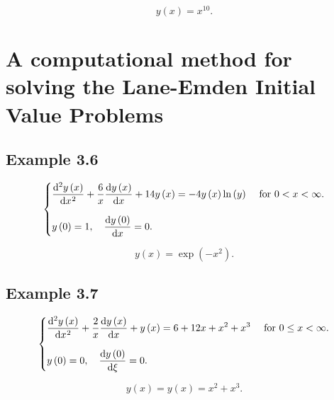 \documentclass{scrartcl}
\begin{document}
\begin{equation*}
	\boxed{y\left(x\right)=x^{10}.}
\end{equation*}

\section{A computational method for solving the Lane-Emden Initial Value Problems}

\subsection*{Example 3.6}

\begin{equation}
	\begin{cases}\displaystyle
		\diff[2]{y\left(x\right)}{x}+
		\frac{6}{x}
		\diff{y\left(x\right)}{x}+
		14y\left(x\right)=
		-4y\left(x\right)
		\ln\left(y\right)
		 & \text { for }0<x<\infty. \\[0.5cm]
		\displaystyle
		y
		\left(0\right)=
		1,\quad
		\diff{y\left(0\right)}{x}=
		0.
		 &
	\end{cases}
\end{equation}

\begin{equation*}
	\boxed{y\left(x\right)=\exp\left(-x^{2}\right).}
\end{equation*}

\subsection*{Example 3.7}

\begin{equation}
	\begin{cases}\displaystyle
		\diff[2]{y\left(x\right)}{x}+
		\frac{2}{x}
		\diff{y\left(x\right)}{x}+
		y\left(x\right)=
		6+12x+x^{2}+x^{3}
		 & \text { for }0\leq x<\infty. \\[0.5cm]
		\displaystyle
		y
		\left(0\right)=
		0,\quad
		\diff{y\left(0\right)}{\xi}=
		0.
		 &
	\end{cases}
\end{equation}

\begin{equation*}
	\boxed{y\left(x\right)=y\left(x\right)=x^{2}+x^{3}.}
\end{equation*}
\end{document}
